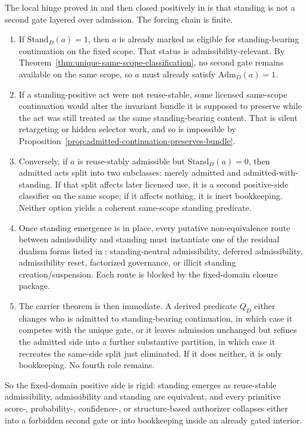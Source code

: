 The local hinge proved in \necessitydoc{} and then closed positively in \standeqdoc{} is that standing is not a second gate layered over admission. The forcing chain is finite.
\begin{enumerate}
  \item If $\mathrm{Stand}_D(a)=1$, then $a$ is already marked as eligible for standing-bearing continuation on the fixed scope. That status is admissibility-relevant. By Theorem~\ref{thm:unique-same-scope-classification}, no second gate remains available on the same scope, so $a$ must already satisfy $\mathrm{Adm}_D(a)=1$.
  \item If a standing-positive act were not reuse-stable, some licensed same-scope continuation would alter the invariant bundle it is supposed to preserve while the act was still treated as the same standing-bearing content. That is silent retargeting or hidden selector work, and so is impossible by Proposition~\ref{prop:admitted-continuation-preserves-bundle}.
  \item Conversely, if $a$ is reuse-stably admissible but $\mathrm{Stand}_D(a)=0$, then admitted acts split into two subclasses: merely admitted and admitted-with-standing. If that split affects later licensed use, it is a second positive-side classifier on the same scope; if it affects nothing, it is inert bookkeeping. Neither option yields a coherent same-scope standing predicate.
  \item Once standing emergence is in place, every putative non-equivalence route between admissibility and standing must instantiate one of the residual dualism forms listed in \standeqdoc{}: standing-neutral admissibility, deferred admissibility, admissibility reset, factorized governance, or illicit standing creation/suspension. Each route is blocked by the fixed-domain closure package.
  \item The carrier theorem is then immediate. A derived predicate $Q_D$ either changes who is admitted to standing-bearing continuation, in which case it competes with the unique gate, or it leaves admission unchanged but refines the admitted side into a further substantive partition, in which case it recreates the same-side split just eliminated. If it does neither, it is only bookkeeping. No fourth role remains.
\end{enumerate}
So the fixed-domain positive side is rigid: standing emerges as reuse-stable admissibility, admissibility and standing are equivalent, and every primitive score-, probability-, confidence-, or structure-based authorizer collapses either into a forbidden second gate or into bookkeeping inside an already gated interior.

